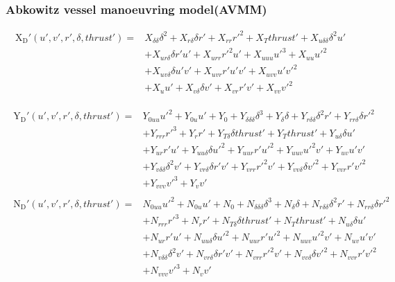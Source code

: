 \subsubsection*{Abkowitz vessel manoeuvring model(AVMM) \cite{abkowitz_ship_1964}}
\begin{equation}\label{equation:02.01_manoeuvring models:eqxabkowitz}
\begin{split}
\operatorname{X_{D}'}{\left(u',v',r',\delta,thrust' \right)} = & X_{\delta\delta} \delta^{2} + X_{r\delta} \delta r' + X_{rr} r'^{2} + X_{T} thrust' + X_{u\delta\delta} \delta^{2} u' \\ 
& + X_{ur\delta} \delta r' u' + X_{urr} r'^{2} u' + X_{uuu} u'^{3} + X_{uu} u'^{2} \\ 
& + X_{uv\delta} \delta u' v' + X_{uvr} r' u' v' + X_{uvv} u' v'^{2} \\
& + X_{u} u' + X_{v\delta} \delta v' + X_{vr} r' v' + X_{vv} v'^{2} 
\end{split}
\end{equation}

\begin{equation}\label{equation:02.01_manoeuvring models:eqyabkowitz}
\begin{split}\begin{split}
\operatorname{Y_{D}'}{\left(u',v',r',\delta,thrust' \right)} = & Y_{0uu} u'^{2} + Y_{0u} u' + Y_{0} + Y_{\delta\delta\delta} \delta^{3} + Y_{\delta} \delta + Y_{r\delta\delta} \delta^{2} r' + Y_{rr\delta} \delta r'^{2} \\ & + Y_{rrr} r'^{3} + Y_{r} r' + Y_{T\delta} \delta thrust' + Y_{T} thrust' + Y_{u\delta} \delta u' \\ & + Y_{ur} r' u' + Y_{uu\delta} \delta u'^{2} + Y_{uur} r' u'^{2} + Y_{uuv} u'^{2} v' + Y_{uv} u' v' \\ & + Y_{v\delta\delta} \delta^{2} v' + Y_{vr\delta} \delta r' v' + Y_{vrr} r'^{2} v' + Y_{vv\delta} \delta v'^{2} + Y_{vvr} r' v'^{2} \\ & + Y_{vvv} v'^{3} + Y_{v} v' 
\end{split}\end{split}
\end{equation}\begin{equation}\label{equation:02.01_manoeuvring models:eqnabkowitz}
\begin{split}\begin{split}
\operatorname{N_{D}'}{\left(u',v',r',\delta,thrust' \right)} = & N_{0uu} u'^{2} + N_{0u} u' + N_{0} + N_{\delta\delta\delta} \delta^{3} + N_{\delta} \delta + N_{r\delta\delta} \delta^{2} r' + N_{rr\delta} \delta r'^{2} \\ & + N_{rrr} r'^{3} + N_{r} r' + N_{T\delta} \delta thrust' + N_{T} thrust' + N_{u\delta} \delta u' \\ & + N_{ur} r' u' + N_{uu\delta} \delta u'^{2} + N_{uur} r' u'^{2} + N_{uuv} u'^{2} v' + N_{uv} u' v' \\ & + N_{v\delta\delta} \delta^{2} v' + N_{vr\delta} \delta r' v' + N_{vrr} r'^{2} v' + N_{vv\delta} \delta v'^{2} + N_{vvr} r' v'^{2} \\ & + N_{vvv} v'^{3} + N_{v} v' 
\end{split}\end{split}
\end{equation}
\sphinxAtStartPar
